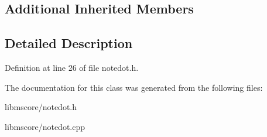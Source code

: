 \subsection*{Additional Inherited Members}


\subsection{Detailed Description}


Definition at line 26 of file notedot.\+h.



The documentation for this class was generated from the following files\+:\begin{DoxyCompactItemize}
\item 
libmscore/notedot.\+h\item 
libmscore/notedot.\+cpp\end{DoxyCompactItemize}
